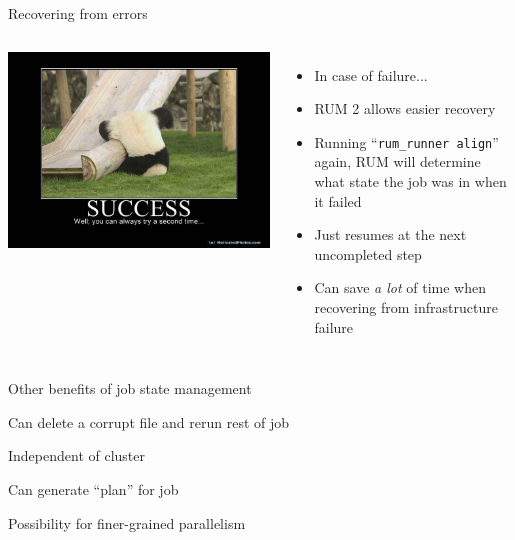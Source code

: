 \documentclass{beamer}
\begin{document}
\begin{frame}{Recovering from errors}
  \begin{columns}[c]
    \column{2in}
    \includegraphics[scale=0.2]{success.jpg}
    \column{2.5in}
    \begin{itemize}

    \item In case of failure...

    \item RUM 2 allows easier recovery

    \item Running ``\texttt{rum\_runner align}'' again, RUM will determine what state the job was in when it failed

    \item Just resumes at the next uncompleted step

    \item Can save \textit{a lot} of time when recovering from infrastructure failure

    \end{itemize}

  \end{columns}
\end{frame}

\begin{frame}{Other benefits of job state management}
  \item Can delete a corrupt file and rerun rest of job
  \item Independent of cluster
  \item Can generate ``plan'' for job
  \item Possibility for finer-grained parallelism
\end{frame}
\end{document}
